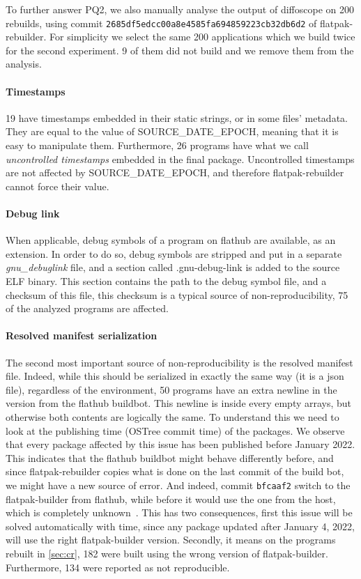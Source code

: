 \documentclass[a4paper,11pt,oneside]{report}
\theoremstyle{definition}
\newcommand{\sysname}{flatpak-rebuilder\xspace}
\newcommand{\fh}{flathub\xspace}
\newcommand{\fb}{flatpak-builder\xspace}
\newcommand{\sde}{SOURCE\_DATE\_EPOCH\xspace}
\newcommand{\fhbb}{flathub buildbot\xspace}
\newcommand{\dfc}{diffoscope\xspace}
\newcommand{\ot}{OSTree\xspace}
\begin{document}
\noindent
To further answer PQ2, we also manually analyse the output of \dfc on 200 rebuilds,
using commit \verb|2685df5edcc00a8e4585fa694859223cb32db6d2| of \sysname. For
simplicity we select the same 200 applications which we build twice for the
second experiment. 9 of them did not build and we remove them from the analysis.

\paragraph*{Timestamps}
19 have timestamps embedded in their static strings, or in some files'
metadata. They are equal to the value of \sde, meaning that it is easy to
manipulate them. Furthermore, 26 programs have what we call \emph{uncontrolled
timestamps} embedded in the final package. Uncontrolled timestamps are not
affected by \sde, and therefore \sysname cannot force their value.

\paragraph*{Debug link}
When applicable, debug symbols of a program on \fh are available, as an
extension. In order to do so, debug symbols are stripped and put in a separate
\emph{gnu\_debuglink} file, and a section called .gnu-debug-link is added to
the source ELF binary. This section contains the path to the debug symbol file,
and a checksum of this file, this checksum is a typical source of
non-reproducibility, 75 of the analyzed programs are affected.

\paragraph*{Resolved manifest serialization}
The second most important source of non-reproducibility is the resolved
manifest file. Indeed, while this should be serialized in exactly the same way
(it is a json file), regardless of the environment, 50 programs have an extra
newline in the version from the \fhbb. This newline is inside every empty
arrays, but otherwise both contents are logically the same. To understand this
we need to look at the publishing time (\ot commit time) of the packages. We
observe that every package affected by this issue has been published before
January 2022. This indicates that the \fhbb might behave differently before,
and since \sysname copies what is done on the last commit of the build bot, we
might have a new source of error. And indeed, commit \verb|bfcaaf2| switch to
the \fb from \fh, while before it would use the one from the host, which is
completely unknown~\cite{gh:ptdr}. This has two consequences, first this issue
will be solved automatically with time, since any package updated after January
4, 2022, will use the right \fb version. Secondly, it means on the programs
rebuilt in \autoref{sec:cr}, 182 were built using the wrong version of \fb.
Furthermore, 134 were reported as not reproducible.
\end{document}
